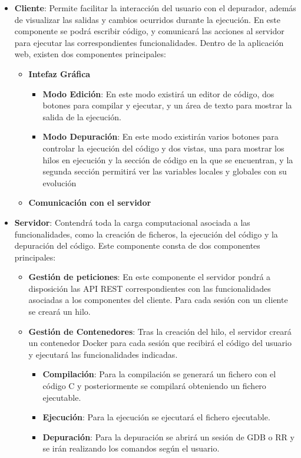 \begin{itemize}
    \item \textbf{Cliente}: Permite facilitar la interacción del usuario con el depurador, además de visualizar las salidas y cambios ocurridos durante la ejecución. En este componente se podrá escribir código, y comunicará las acciones al servidor para ejecutar las correspondientes funcionalidades. 
    Dentro de la aplicación web, existen dos componentes principales:

    \begin{itemize}
        \item \textbf{Intefaz Gráfica}
        \begin{itemize}
            \item \textbf{Modo Edición}: En este modo existirá un editor de código, dos botones para compilar y ejecutar, y un área de texto para mostrar la salida de la ejecución. 
            \item \textbf{Modo Depuración}: En este modo existirán varios botones para controlar la ejecución del código y dos vistas, una para mostrar los hilos en ejecución y la sección de código en la que se encuentran, y la segunda sección permitirá ver las variables locales y globales con su evolución
        \end{itemize}
        \item \textbf{Comunicación con el servidor}
    \end{itemize}

    \item \textbf{Servidor}: Contendrá toda la carga computacional asociada a las funcionalidades, como la creación de ficheros, la ejecución del código y la depuración del código.
    Este componente consta de dos componentes principales:
    \begin{itemize}
        \item \textbf{Gestión de peticiones}: En este componente el servidor pondrá a disposición las API REST correspondientes con las funcionalidades asociadas a los componentes del cliente. Para cada sesión con un cliente se creará un hilo.
        \item \textbf{Gestión de Contenedores}: Tras la creación del hilo, el servidor creará un contenedor Docker para cada sesión que recibirá el código del usuario y ejecutará las funcionalidades indicadas. 
        \begin{itemize}
            \item \textbf{Compilación}: Para la compilación se generará un fichero con el código C y posteriormente se compilará obteniendo un fichero ejecutable. 
            \item \textbf{Ejecución}: Para la ejecución se ejecutará el fichero ejecutable. 
            \item \textbf{Depuración}: Para la depuración se abrirá un sesión de GDB o RR y se irán realizando los comandos según el usuario.
        \end{itemize}
    \end{itemize}
\end{itemize}

